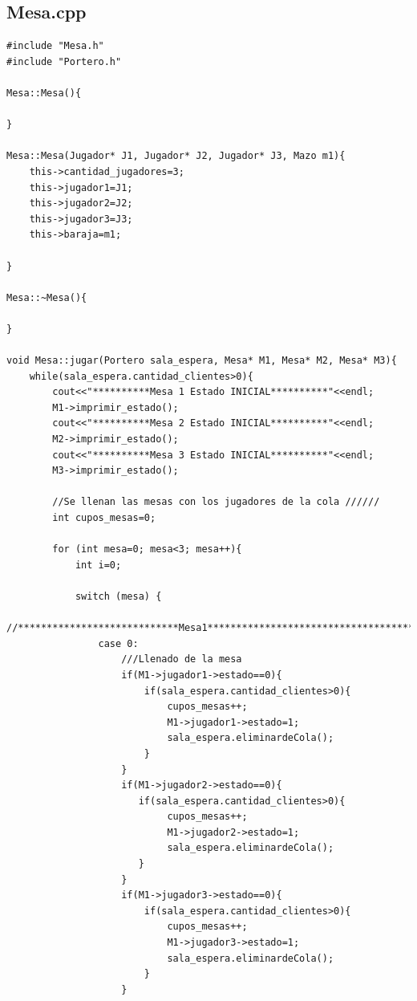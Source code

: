 \documentclass[11pt]{article}
\begin{document}
\subsection{Mesa.cpp}
\begin{lstlisting}
#include "Mesa.h"
#include "Portero.h"

Mesa::Mesa(){
    
}

Mesa::Mesa(Jugador* J1, Jugador* J2, Jugador* J3, Mazo m1){
    this->cantidad_jugadores=3;
    this->jugador1=J1;
    this->jugador2=J2;
    this->jugador3=J3;
    this->baraja=m1;
    
}

Mesa::~Mesa(){
    
}

void Mesa::jugar(Portero sala_espera, Mesa* M1, Mesa* M2, Mesa* M3){
    while(sala_espera.cantidad_clientes>0){
        cout<<"**********Mesa 1 Estado INICIAL**********"<<endl;
        M1->imprimir_estado();
        cout<<"**********Mesa 2 Estado INICIAL**********"<<endl;
        M2->imprimir_estado();
        cout<<"**********Mesa 3 Estado INICIAL**********"<<endl;
        M3->imprimir_estado();

        //Se llenan las mesas con los jugadores de la cola //////
        int cupos_mesas=0;

        for (int mesa=0; mesa<3; mesa++){
            int i=0;

            switch (mesa) {
                //****************************Mesa1**************************************
                case 0:
                    ///Llenado de la mesa
                    if(M1->jugador1->estado==0){
                        if(sala_espera.cantidad_clientes>0){
                            cupos_mesas++;
                            M1->jugador1->estado=1;
                            sala_espera.eliminardeCola();
                        }
                    }
                    if(M1->jugador2->estado==0){
                       if(sala_espera.cantidad_clientes>0){ 
                            cupos_mesas++;
                            M1->jugador2->estado=1;
                            sala_espera.eliminardeCola();
                       }
                    }
                    if(M1->jugador3->estado==0){
                        if(sala_espera.cantidad_clientes>0){
                            cupos_mesas++;
                            M1->jugador3->estado=1;
                            sala_espera.eliminardeCola();
                        }
                    }


\end{lstlisting}
\end{document}
